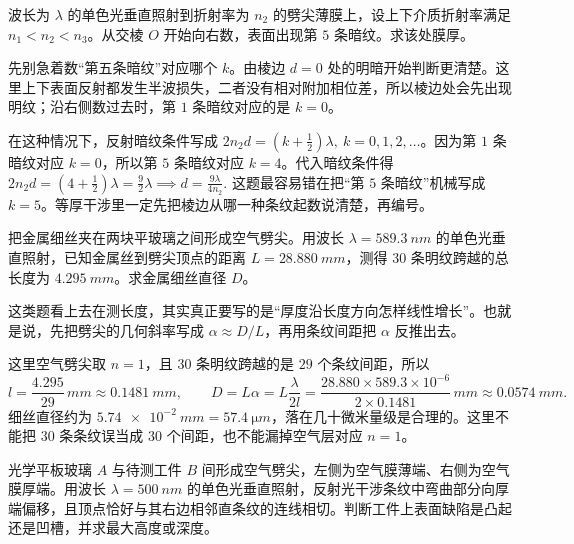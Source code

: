 \documentclass[lang=cn,11pt]{elegantbook}
\begin{document}
\begin{exercise}[第五条暗纹对应的膜厚为什么先从棱边明暗判起]
波长为 \(\lambda\) 的单色光垂直照射到折射率为 \(n_2\) 的劈尖薄膜上，设上下介质折射率满足 \(n_1<n_2<n_3\)。从交棱 \(O\) 开始向右数，表面出现第 \(5\) 条暗纹。求该处膜厚。
\end{exercise}

\begin{solution}
先别急着数“第五条暗纹”对应哪个 \(k\)。由棱边 \(d=0\) 处的明暗开始判断更清楚。这里上下表面反射都发生半波损失，二者没有相对附加相位差，所以棱边处会先出现明纹；沿右侧数过去时，第 \(1\) 条暗纹对应的是 \(k=0\)。

在这种情况下，反射暗纹条件写成 \(2n_2d=(k+\frac12)\lambda,\ k=0,1,2,\dots\)。因为第 \(1\) 条暗纹对应 \(k=0\)，所以第 \(5\) 条暗纹对应 \(k=4\)。代入暗纹条件得
 \(2n_2d=\left(4+\frac12\right)\lambda=\frac{9}{2}\lambda \implies d=\frac{9\lambda}{4n_2}.\) 
这题最容易错在把“第 \(5\) 条暗纹”机械写成 \(k=5\)。等厚干涉里一定先把棱边从哪一种条纹起数说清楚，再编号。
\end{solution}

\begin{exercise}[用劈尖条纹间距测金属细丝直径时为什么先写几何斜率]
把金属细丝夹在两块平玻璃之间形成空气劈尖。用波长 \(\lambda=\SI{589.3}{nm}\) 的单色光垂直照射，已知金属丝到劈尖顶点的距离 \(L=\SI{28.880}{mm}\)，测得 \(30\) 条明纹跨越的总长度为 \(\SI{4.295}{mm}\)。求金属细丝直径 \(D\)。
\end{exercise}

\begin{solution}
这类题看上去在测长度，其实真正要写的是“厚度沿长度方向怎样线性增长”。也就是说，先把劈尖的几何斜率写成 \(\alpha\approx D/L\)，再用条纹间距把 \(\alpha\) 反推出去。

这里空气劈尖取 \(n=1\)，且 \(30\) 条明纹跨越的是 \(29\) 个条纹间距，所以
\[
l=\frac{4.295}{29}\,\si{mm}\approx \SI{0.1481}{mm},\qquad
D=L\alpha=L\frac{\lambda}{2l}
=\frac{28.880\times 589.3\times10^{-6}}{2\times0.1481}\,\si{mm}
\approx \SI{0.0574}{mm}.
\]
细丝直径约为 \(\SI{5.74e-2}{mm}=\SI{57.4}{\micro m}\)，落在几十微米量级是合理的。这里不能把 \(30\) 条条纹误当成 \(30\) 个间距，也不能漏掉空气层对应 \(n=1\)。
\end{solution}


\begin{exercise}[空气劈尖条纹弯向厚端时怎样判断凸凹缺陷]
光学平板玻璃 \(A\) 与待测工件 \(B\) 间形成空气劈尖，左侧为空气膜薄端、右侧为空气膜厚端。用波长 \(\lambda=\SI{500}{nm}\) 的单色光垂直照射，反射光干涉条纹中弯曲部分向厚端偏移，且顶点恰好与其右边相邻直条纹的连线相切。判断工件上表面缺陷是凸起还是凹槽，并求最大高度或深度。
\end{exercise}
\end{document}
